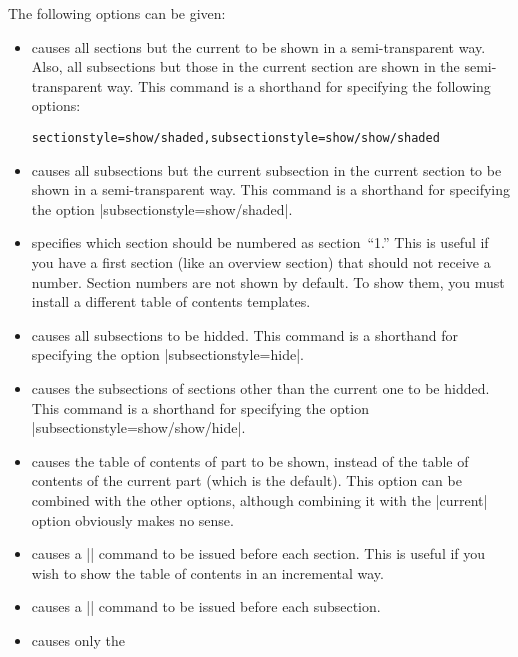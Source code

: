 \begin{command}{\tableofcontents{}}
  The following options can be given:
  \begin{itemize}
  \item
     causes all sections but the current to
    be shown in a semi-transparent way. Also, all subsections but
    those in the current section are shown in the semi-transparent
    way. This command is a shorthand for specifying the following
    options: 
\begin{verbatim}
sectionstyle=show/shaded,subsectionstyle=show/show/shaded
\end{verbatim}
  \item
     causes all subsections but the
    current subsection in the current section to be shown in a
    semi-transparent way. This command is a shorthand for specifying
    the option |subsectionstyle=show/shaded|.
  \item
     specifies which
    section should be numbered as section~``1.''  This is useful if
    you have a first section (like an overview section) that should
    not receive a number. Section numbers are not shown by default. To
    show them, you must install a different table of contents
    templates.
  \item
     causes all subsections to be
    hidded. This command is a shorthand for specifying
    the option |subsectionstyle=hide|.
  \item
     causes the subsections of
    sections other than the current one to be hidded. This command is
    a shorthand for specifying the option |subsectionstyle=show/show/hide|.
  \item
     causes the table of contents
    of part  to be shown, instead of the table of
    contents of the current part (which is the default). This option
    can be combined with the other options, although combining it with
    the |current| option obviously makes no sense.
  \item
     causes a |\pause| command to
    be issued before each section. This is useful if you wish to show
    the table of contents in an incremental way.
  \item
     causes a |\pause| command to
    be issued before each subsection.
  \item
     causes only the

\end{itemize}
\end{command}
